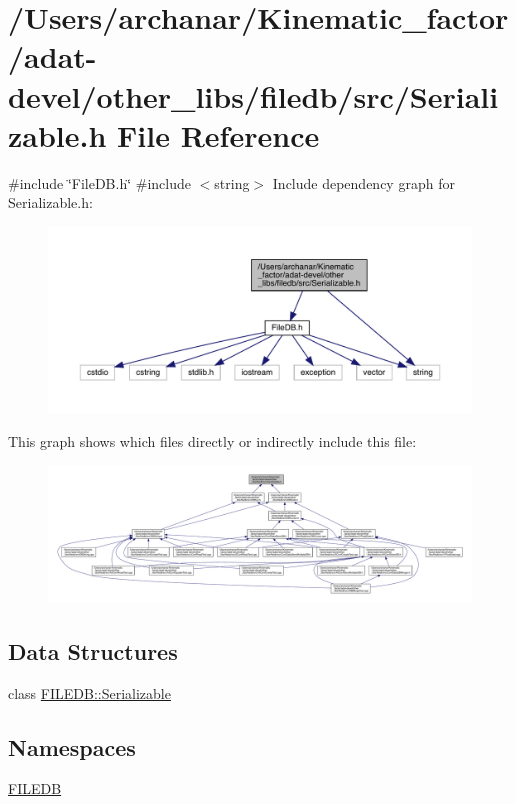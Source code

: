 \hypertarget{adat-devel_2other__libs_2filedb_2src_2Serializable_8h}{}\section{/\+Users/archanar/\+Kinematic\+\_\+factor/adat-\/devel/other\+\_\+libs/filedb/src/\+Serializable.h File Reference}
\label{adat-devel_2other__libs_2filedb_2src_2Serializable_8h}
{\ttfamily \#include \char`\"{}File\+D\+B.\+h\char`\"{}}\newline
{\ttfamily \#include $<$string$>$}\newline
Include dependency graph for Serializable.\+h\+:
\nopagebreak
\begin{figure}[H]
\begin{center}
\leavevmode
\includegraphics[width=350pt]{d2/dd5/adat-devel_2other__libs_2filedb_2src_2Serializable_8h__incl}
\end{center}
\end{figure}
This graph shows which files directly or indirectly include this file\+:
\nopagebreak
\begin{figure}[H]
\begin{center}
\leavevmode
\includegraphics[width=350pt]{d1/d26/adat-devel_2other__libs_2filedb_2src_2Serializable_8h__dep__incl}
\end{center}
\end{figure}
\subsection*{Data Structures}
\begin{DoxyCompactItemize}
\item 
class \mbox{\hyperlink{classFILEDB_1_1Serializable}{F\+I\+L\+E\+D\+B\+::\+Serializable}}
\end{DoxyCompactItemize}
\subsection*{Namespaces}
\begin{DoxyCompactItemize}
\item 
 \mbox{\hyperlink{namespaceFILEDB}{F\+I\+L\+E\+DB}}
\end{DoxyCompactItemize}
